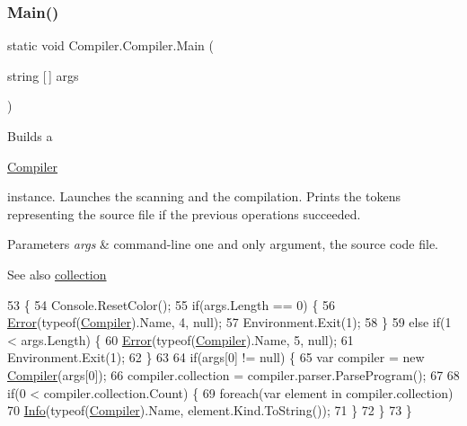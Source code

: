 \subsubsection{\texorpdfstring{Main()}{Main()}}
{\footnotesize\ttfamily static void Compiler.\+Compiler.\+Main (\begin{DoxyParamCaption}\item[{string \mbox{[}$\,$\mbox{]}}]{args }\end{DoxyParamCaption})\hspace{0.3cm}{\ttfamily [static]}}

Builds a
\begin{DoxyCode}
\mbox{\hyperlink{namespace_compiler}{Compiler}} 
\end{DoxyCode}
 instance. Launches the scanning and the compilation. Prints the tokens representing the source file if the previous operations succeeded. 
\begin{DoxyParams}{Parameters}
{\em args} & command-\/line one and only argument, the source code file. \\
\hline
\end{DoxyParams}
\begin{DoxySeeAlso}{See also}
\mbox{\hyperlink{class_compiler_1_1_compiler_a8279f3629691412ae917e1760437d670}{collection}} 
\end{DoxySeeAlso}

\begin{DoxyCode}
53                                                        \{
54                     Console.ResetColor();
55                     \textcolor{keywordflow}{if}(args.Length == 0) \{
56                         \mbox{\hyperlink{class_compiler_1_1_compiler_af3467c4a37bb5379d3da14188042193c}{Error}}(typeof(\mbox{\hyperlink{namespace_compiler}{Compiler}}).Name, 4, null);
57                         Environment.Exit(1);
58                     \}
59                     \textcolor{keywordflow}{else} \textcolor{keywordflow}{if}(1 < args.Length) \{
60                         \mbox{\hyperlink{class_compiler_1_1_compiler_af3467c4a37bb5379d3da14188042193c}{Error}}(typeof(\mbox{\hyperlink{namespace_compiler}{Compiler}}).Name, 5, null);
61                         Environment.Exit(1);
62                     \}
63 
64                     \textcolor{keywordflow}{if}(args[0] != null) \{
65                         var compiler = \textcolor{keyword}{new} \mbox{\hyperlink{class_compiler_1_1_compiler_ab9ae50ccd497464301c3bd9acf5d1d89}{Compiler}}(args[0]);
66                         compiler.collection = compiler.parser.ParseProgram();
67 
68                         \textcolor{keywordflow}{if}(0 < compiler.collection.Count) \{
69                             \textcolor{keywordflow}{foreach}(var element \textcolor{keywordflow}{in} compiler.collection)
70                                 \mbox{\hyperlink{class_compiler_1_1_compiler_a1c4bba751de5a1ac6db0006cb6203ed4}{Info}}(typeof(\mbox{\hyperlink{namespace_compiler}{Compiler}}).Name, element.Kind.ToString());
71                         \}
72                     \}
73                 \}
\end{DoxyCode}


